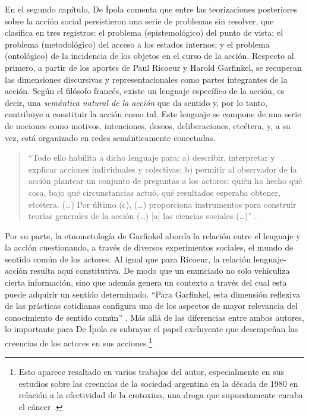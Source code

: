 {En el segundo capítulo, De Ípola comenta que entre las teorizaciones posteriores sobre la acción social persistieron una serie de problemas sin resolver, que clasifica en tres registros: el problema (epistemológico) del punto de vista; el problema (metodológico) del acceso a los estados internos; y el problema (ontológico) de la incidencia de los objetos en el curso de la acción. Respecto al primero, a partir de los aportes de Paul Ricoeur y Harold Garfinkel, se recuperan las dimensiones discursivas y representacionales como partes integrantes de la acción. Según el filósofo francés, existe un lenguaje específico de la acción, es decir, una \emph{semántica natural de la acción} que da sentido y, por lo tanto, contribuye a constituir la acción como tal. Este lenguaje se compone de una serie de nociones como motivos, intenciones, deseos, deliberaciones, etcétera, y, a su vez, está organizado en redes semánticamente conectadas.

\begin{quote}
\enquote{Todo ello habilita a dicho lenguaje para: a) describir, interpretar y explicar acciones individuales y  colectivas; b) permitir al observador de la acción plantear un conjunto de preguntas a los actores: quién ha hecho qué cosa, bajo qué circunstancias actuó, qué resultados esperaba obtener, etcétera. (\dots) Por último (c), (\dots) proporciona instrumentos para construir teorías generales de la acción (\dots) [a] las ciencias sociales (\dots)} \parencite[53]{1600-DEIPOLA2001}.
\end{quote}

Por su parte, la etnometología de Garfinkel aborda la relación entre el lenguaje y la acción cuestionando, a través de diversos experimentos sociales, el mundo de sentido común de los actores. Al igual que para Ricoeur, la relación lenguaje-acción resulta aquí constitutiva. De modo que un enunciado no solo vehiculiza cierta información, sino que además genera un contexto a través del cual esta puede adquirir un sentido determinado. \enquote{Para Garfinkel, esta dimensión reflexiva de las prácticas cotidianas configura uno de los aspectos de mayor relevancia del conocimiento de sentido común} \parencite[41]{1600-DEIPOLA2001}. Más allá de las diferencias entre ambos autores, lo importante para De Ípola es subrayar el papel excluyente que desempeñan las creencias de los actores en sus acciones.\footnote{Esto aparece resaltado en varios trabajos del autor, especialmente en sus estudios sobre las creencias de la sociedad argentina en la década de 1980 en relación a la efectividad de la crotoxina, una droga que supuestamente curaba el cáncer \parencite{1592-DEIPOLA1997,1610-DEIPOLA2002}.}

}
